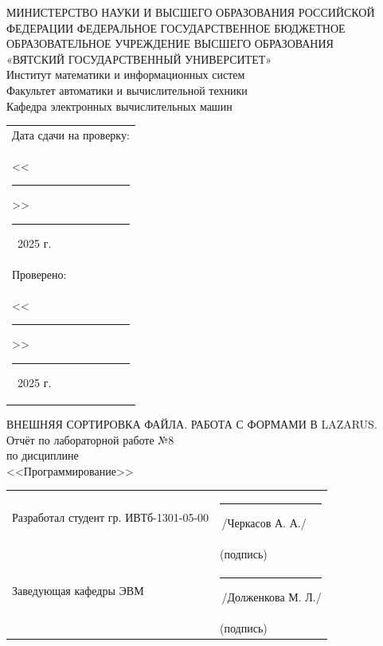 \documentclass[oneside,a4paper,14pt]{extarticle}
\begin{document}
\newpage
\thispagestyle{empty}
\begin{center}
	МИНИСТЕРСТВО НАУКИ И ВЫСШЕГО ОБРАЗОВАНИЯ РОССИЙСКОЙ ФЕДЕРАЦИИ ФЕДЕРАЛЬНОЕ ГОСУДАРСТВЕННОЕ БЮДЖЕТНОЕ ОБРАЗОВАТЕЛЬНОЕ УЧРЕЖДЕНИЕ ВЫСШЕГО ОБРАЗОВАНИЯ\\
	«ВЯТСКИЙ ГОСУДАРСТВЕННЫЙ УНИВЕРСИТЕТ»\\
	Институт математики и информационных систем\\
	Факультет автоматики и вычислительной техники\\
	Кафедра электронных вычислительных машин
\end{center}
\vspace{10mm}

\hfill
\begin{tabular}{l}
	\footnotesize Дата сдачи на проверку:                                          \\
	\footnotesize <<\rule[-1mm]{5mm}{0.10mm}\/>>\rule[-1mm]{20mm}{0.10mm}\ 2025 г. \\
	\footnotesize Проверено:                                                       \\
	\footnotesize <<\rule[-1mm]{5mm}{0.10mm}\/>>\rule[-1mm]{20mm}{0.10mm}\ 2025 г. \\
\end{tabular}
\vfill

\begin{center}
	ВНЕШНЯЯ СОРТИРОВКА ФАЙЛА. РАБОТА С ФОРМАМИ В LAZARUS.\\
	Отчёт по лабораторной работе №8\\
	по дисциплине\\
	<<Программирование>>\\
\end{center}
\vspace{25mm}
\noindent
\begin{tabular}{ll}
	Разработал студент гр. ИВТб-1301-05-00 & \rule[-1mm]{30mm}{0.10mm}\,/Черкасов А. А./   \\
	                                       & \hspace{8mm}\footnotesize(подпись)            \\
	Заведующая кафедры ЭВМ                 & \rule[-1mm]{30mm}{0.10mm}\,/Долженкова М. Л./ \\
	                                       & \hspace{8mm}\footnotesize(подпись)            \\
\end{tabular}
\end{document}
